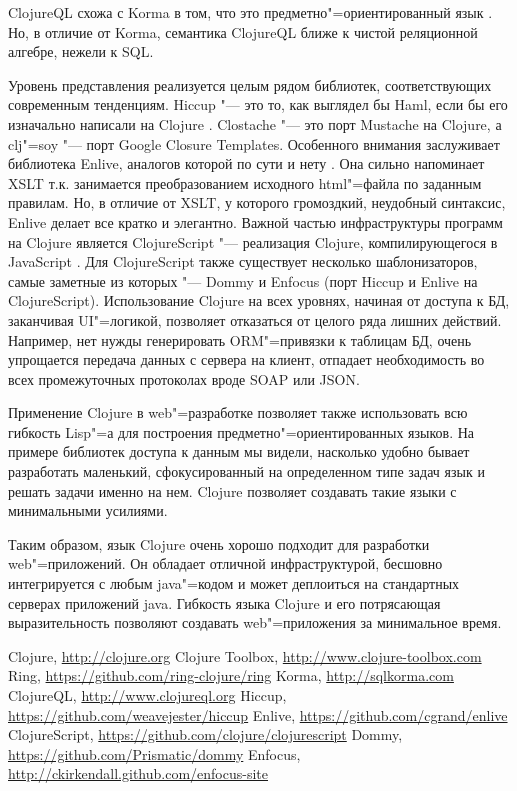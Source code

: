 \documentclass[10pt, a5paper]{article}
\begin{document}
ClojureQL схожа с Korma в том, что это предметно"=ориентированный язык \cite{Bushenko5}. Но, в отличие от Korma, семантика ClojureQL ближе к чистой реляционной алгебре, нежели к SQL.

Уровень представления реализуется целым рядом библиотек, соответствующих современным тенденциям. Hiccup "--- это то, как выглядел бы Haml, если бы его изначально написали на Clojure \cite{Bushenko6}. Clostache "--- это порт Mustache на Clojure, а clj"=soy "--- порт Google Closure Templates. Особенного внимания заслуживает библиотека Enlive, аналогов которой по сути и нету \cite{Bushenko7}. Она сильно напоминает XSLT т.к. занимается преобразованием исходного html"=файла по заданным правилам. Но, в отличие от XSLT, у которого громоздкий, неудобный синтаксис, Enlive делает все кратко и элегантно.
Важной частью инфраструктуры программ на Clojure является ClojureScript "--- реализация Clojure, компилирующегося в JavaScript \cite{Bushenko8}. Для ClojureScript также существует несколько шаблонизаторов, самые заметные из которых "--- Dommy \cite{Bushenko9} и Enfocus \cite{Bushenko10} (порт Hiccup и Enlive на ClojureScript). Использование Clojure на всех уровнях, начиная от доступа к БД, заканчивая UI"=логикой, позволяет отказаться от целого ряда лишних действий. Например, нет нужды генерировать ORM"=привязки к таблицам БД, очень упрощается передача данных с сервера на клиент, отпадает необходимость во всех промежуточных протоколах вроде SOAP или JSON.

Применение Clojure в web"=разработке позволяет также использовать всю гибкость Lisp"=а для построения предметно"=ориентированных языков. На примере библиотек доступа к данным мы видели, насколько удобно бывает разработать маленький, сфокусированный на определенном типе задач язык и решать задачи именно на нем. Clojure позволяет создавать такие языки с минимальными усилиями.

Таким образом, язык Clojure очень хорошо подходит для разработки web"=приложений. Он обладает отличной инфраструктурой, бесшовно интегрируется с любым java"=кодом и может деплоиться на стандартных серверах приложений java. Гибкость языка Clojure и его потрясающая выразительность позволяют создавать web"=приложения за минимальное время.

\begin{thebibliography}{99}

 Clojure, \url{http://clojure.org}
 Clojure Toolbox, \url{http://www.clojure-toolbox.com}
 Ring, \url{https://github.com/ring-clojure/ring}
 Korma, \url{http://sqlkorma.com}
 ClojureQL, \url{http://www.clojureql.org}
 Hiccup, \url{https://github.com/weavejester/hiccup}
 Enlive, \url{https://github.com/cgrand/enlive}
 ClojureScript, \url{https://github.com/clojure/clojurescript}
 Dommy, \url{https://github.com/Prismatic/dommy}
 Enfocus, \url{http://ckirkendall.github.com/enfocus-site}
\end{thebibliography}
\end{document}
